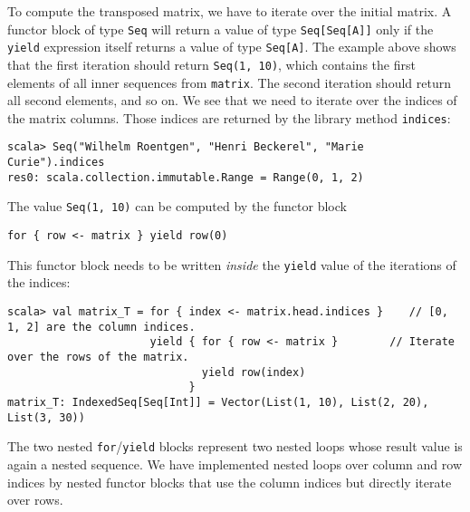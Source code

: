 \noindent To compute the transposed matrix, we have to iterate over
the initial matrix. A functor block of type \lstinline!Seq! will
return a value of type \lstinline!Seq[Seq[A]]! only if the \lstinline!yield!
expression itself returns a value of type \lstinline!Seq[A]!. The
example above shows that the first iteration should return \lstinline!Seq(1, 10)!,
which contains the first elements of all inner sequences from \lstinline!matrix!.
The second iteration should return all second elements, and so on.
We see that we need to iterate over the indices of the matrix columns.
Those indices are returned by the library method \lstinline!indices!:
\begin{lstlisting}
scala> Seq("Wilhelm Roentgen", "Henri Beckerel", "Marie Curie").indices
res0: scala.collection.immutable.Range = Range(0, 1, 2)
\end{lstlisting}
The value \lstinline!Seq(1, 10)! can be computed by the functor block
\begin{lstlisting}
for { row <- matrix } yield row(0)
\end{lstlisting}
This functor block needs to be written \emph{inside} the \lstinline!yield!
value of the iterations of the indices:
\begin{lstlisting}
scala> val matrix_T = for { index <- matrix.head.indices }    // [0, 1, 2] are the column indices.
                      yield { for { row <- matrix }        // Iterate over the rows of the matrix.
                              yield row(index)
                            }
matrix_T: IndexedSeq[Seq[Int]] = Vector(List(1, 10), List(2, 20), List(3, 30))
\end{lstlisting}

The two nested \lstinline!for!/\lstinline!yield! blocks represent
two nested loops whose result value is again a nested sequence. We
have implemented nested loops over column and row indices by nested
functor blocks that use the column indices but directly iterate over
rows.

